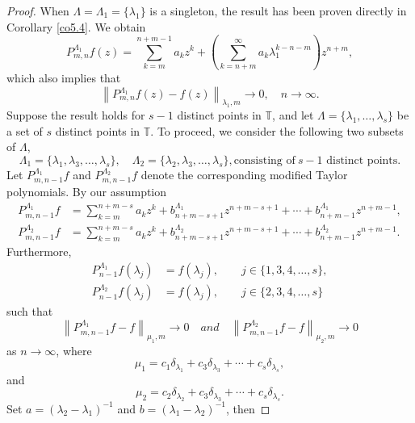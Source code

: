 \documentclass[12pt,reqno]{amsart}
\begin{document}
\begin{proof}
When $\Lambda = {\Lambda _1}= \{ {\lambda _1}\} $ is a singleton, the result has been proven directly in Corollary \ref{co5.4}. We obtain
\[P_{m,n}^{{\Lambda _1}}f(z) = \sum\limits_{k = m}^{n + m - 1} {{a_k}{z^k}}  + \left( {\sum\limits_{k = n + m}^\infty  {{a_k}\lambda _1^{k - n - m}} } \right){z^{n + m}},\]
which also implies that
\[{\left\| {P_{m,n}^{{\Lambda _1}}f(z) - f(z)} \right\|_{{\lambda _1},m}} \to 0, \quad n \to \infty.\]
Suppose the result holds for \( s - 1 \) distinct points in \( \mathbb{T} \), and let \( \Lambda = \{\lambda_1, \ldots, \lambda_s\} \) be a set of \( s \) distinct points in \( \mathbb{T} \). To proceed, we consider the following two subsets of \( \Lambda \),
\[
\Lambda_1 = \{\lambda_1, \lambda_3, \ldots, \lambda_s\}, \quad
\Lambda_2 = \{\lambda_2, \lambda_3, \ldots, \lambda_s\}, \text{consisting of} \ s - 1 \text{ distinct points}.
\]
Let $P_{m,n - 1}^{{\Lambda _1}}f$ and $P_{m,n - 1}^{{\Lambda _2}}f$ denote the corresponding modified Taylor polynomials. By our assumption
\begin{align*}
P_{m,n - 1}^{{\Lambda _1}}f &= \sum\limits_{k = m}^{n + m - s} {{a_k}{z^k}}  + b_{n + m - s + 1}^{{\Lambda _1}}{z^{n + m - s + 1}} +  \cdots  + b_{n + m - 1}^{{\Lambda _1}}{z^{n + m - 1}},\\
P_{m,n - 1}^{{\Lambda _2}}f &= \sum\limits_{k = m}^{n + m - s} {{a_k}{z^k}}  + b_{n + m - s + 1}^{{\Lambda _2}}{z^{n + m - s + 1}} +  \cdots  + b_{n + m - 1}^{{\Lambda _2}}{z^{n + m - 1}}.
\end{align*}
Furthermore,
\begin{align}
P^{\Lambda_1}_{n-1} f(\lambda_j) &= f(\lambda_j), \hspace{2em} j \in \{1,3,4,\ldots,s\}, \tag{4.7} \\
P^{\Lambda_2}_{n-1} f(\lambda_j) &= f(\lambda_j), \hspace{2em} j \in \{2,3,4,\ldots,s\} \tag{4.8}
\end{align}
such that
\begin{equation}
{\left\| {P_{m,n - 1}^{{\Lambda _1}}f - f} \right\|_{{\mu _1},m}} \to 0\quad and \quad {\left\| {P_{m,n - 1}^{{\Lambda _2}}f - f} \right\|_{{\mu _2},m}} \to 0 \tag{4.9}
\end{equation}
as $n\to\infty$, where
\[
\mu_1 = c_1 \delta_{\lambda_1} + c_3 \delta_{\lambda_3} + \cdots + c_s \delta_{\lambda_s},
\]
and
\[
{\mu _2} = {c_2}{\delta _{{\lambda _2}}} + {c_3}{\delta _{{\lambda _3}}} +  \cdots  + {c_s}{\delta _{{\lambda _s}}}.
\]
Set \( a = (\lambda_2 - \lambda_1)^{-1} \) and \( b = (\lambda_1 - \lambda_2)^{-1} \), then

\end{proof}
\end{document}
